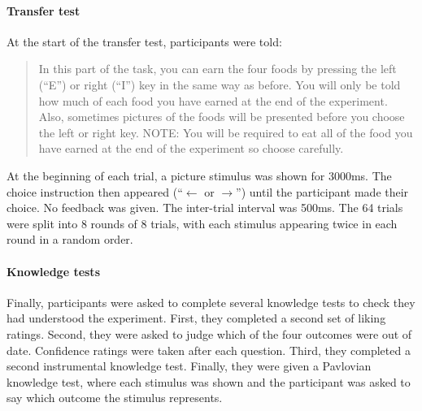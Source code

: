 \documentclass[12pt]{article}
\begin{document}
\paragraph{Transfer test}
At the start of the transfer test, participants were told: 

\blockquote{In this part of the task, you can earn the four foods by pressing
the left (``E'') or right (``I'') key in the same way as before. You will only
be told how much of each food you have earned at the end of the experiment.
Also, sometimes pictures of the foods will be presented before you choose the
left or right key. NOTE: You will be required to eat all of the food you have
earned at the end of the experiment so choose carefully.}

At the beginning of each trial, a picture stimulus was shown for 3000ms. The
choice instruction then appeared (``$\leftarrow$ or $\rightarrow$'') until the
participant made their choice. No feedback was given. The inter-trial interval
was 500ms. The 64 trials were split into 8 rounds of 8 trials, with each
stimulus appearing twice in each round in a random order. 

\paragraph{Knowledge tests}
Finally, participants were asked to complete several knowledge tests to check
they had understood the experiment. First, they completed a second set of
liking ratings. Second, they were asked to judge which of the four outcomes 
were out of date. Confidence ratings were taken after each question. Third,
they completed a second instrumental knowledge test. Finally, they were given a
Pavlovian knowledge test, where each stimulus was shown and the participant was
asked to say which outcome the stimulus represents. 
\end{document}
